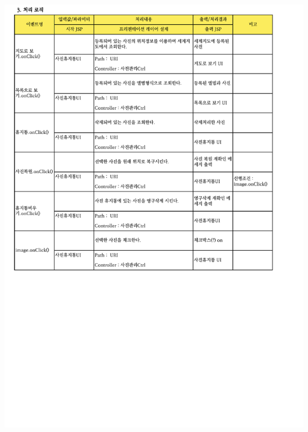 {{{{{{{{{{{{{{{{{{{{{{{{{{{{{{{{{{{{{{{{{\includegraphics[width=20cm]{./Figure/Analysis/Display/photo/photo_08.pdf} \\
}}}}}}}}}}}}}}}}}}}}}}}}}}}}}}}}}}}}}}}}}
